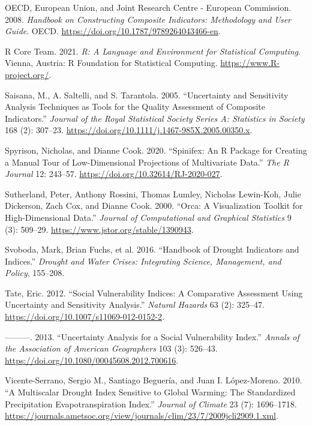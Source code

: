 \documentclass[
]{interact}
\newlength{\cslhangindent}
\newenvironment{CSLReferences}[2] %
 {\begin{list}{}{%
  \setlength{\itemindent}{0pt}
  \setlength{\leftmargin}{0pt}
  \setlength{\parsep}{0pt}
  \ifodd #1
   \setlength{\leftmargin}{\cslhangindent}
   \setlength{\itemindent}{-1\cslhangindent}
  \fi
  \setlength{\itemsep}{#2\baselineskip}}}
 {\end{list}}
\begin{document}
\begin{CSLReferences}{1}{0}
OECD, European Union, and Joint Research Centre - European Commission.
2008. \emph{Handbook on {Constructing} {Composite} {Indicators}:
{Methodology} and {User} {Guide}}. OECD.
\url{https://doi.org/10.1787/9789264043466-en}.

R Core Team. 2021. \emph{R: A Language and Environment for Statistical
Computing}. Vienna, Austria: R Foundation for Statistical Computing.
\url{https://www.R-project.org/}.

Saisana, M., A. Saltelli, and S. Tarantola. 2005. {``{Uncertainty and
Sensitivity Analysis Techniques as Tools for the Quality Assessment of
Composite Indicators}.''} \emph{Journal of the Royal Statistical Society
Series A: Statistics in Society} 168 (2): 307--23.
\url{https://doi.org/10.1111/j.1467-985X.2005.00350.x}.

Spyrison, Nicholas, and Dianne Cook. 2020. {``Spinifex: An {R} Package
for Creating a Manual Tour of Low-Dimensional Projections of
Multivariate Data.''} \emph{The R Journal} 12: 243--57.
\url{https://doi.org/10.32614/RJ-2020-027}.

Sutherland, Peter, Anthony Rossini, Thomas Lumley, Nicholas Lewin-Koh,
Julie Dickerson, Zach Cox, and Dianne Cook. 2000. {``Orca: {A}
{Visualization} {Toolkit} for {High}-{Dimensional} {Data}.''}
\emph{Journal of Computational and Graphical Statistics} 9 (3): 509--29.
\url{https://www.jstor.org/stable/1390943}.

Svoboda, Mark, Brian Fuchs, et al. 2016. {``Handbook of Drought
Indicators and Indices.''} \emph{Drought and Water Crises: Integrating
Science, Management, and Policy}, 155--208.

Tate, Eric. 2012. {``Social Vulnerability Indices: A Comparative
Assessment Using Uncertainty and Sensitivity Analysis.''} \emph{Natural
Hazards} 63 (2): 325--47.
\url{https://doi.org/10.1007/s11069-012-0152-2}.

---------. 2013. {``Uncertainty {Analysis} for a {Social}
{Vulnerability} {Index}.''} \emph{Annals of the Association of American
Geographers} 103 (3): 526--43.
\url{https://doi.org/10.1080/00045608.2012.700616}.

Vicente-Serrano, Sergio M., Santiago Beguería, and Juan I. López-Moreno.
2010. {``A {Multiscalar} {Drought} {Index} {Sensitive} to {Global}
{Warming}: {The} {Standardized} {Precipitation} {Evapotranspiration}
{Index}.''} \emph{Journal of Climate} 23 (7): 1696--1718.
\url{https://journals.ametsoc.org/view/journals/clim/23/7/2009jcli2909.1.xml}.


\end{CSLReferences}
\end{document}
